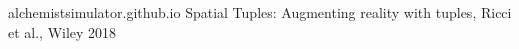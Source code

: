\documentclass[12pt,a4paper,openright,twoside]{report}
\begin{document}
\begin{thebibliography}{90} %
\rhead[\fancyplain{}{\bfseries \leftmark}]{\fancyplain{}{\bfseries \thepage}}

 alchemistsimulator.github.io
 Spatial Tuples: Augmenting reality with tuples, Ricci et al., Wiley 2018


\end{thebibliography}
\end{document}
